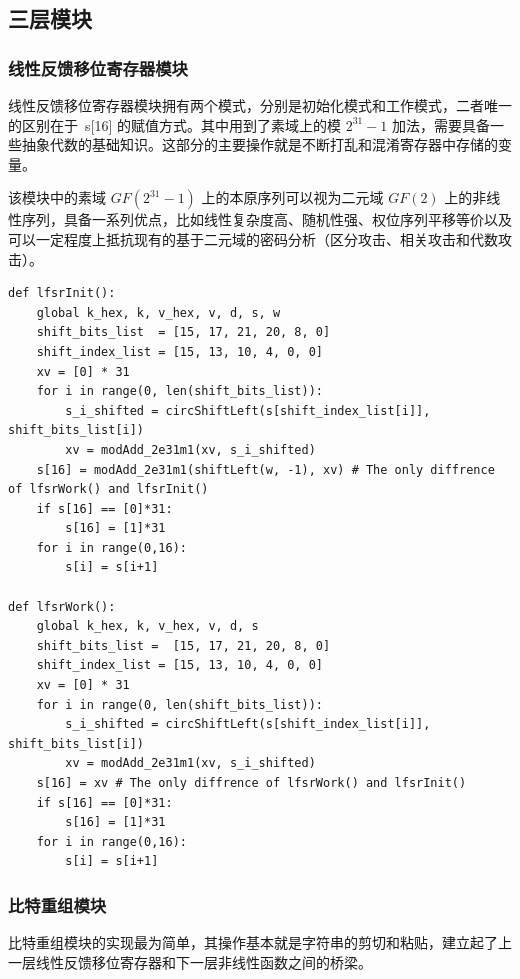 \subsection{三层模块}

\subsubsection{线性反馈移位寄存器模块}

线性反馈移位寄存器模块拥有两个模式，分别是初始化模式和工作模式，二者唯一的区别在于\ {\cnsls s[16]} 的赋值方式。其中用到了素域上的模 $2^{31}-1$ 加法，需要具备一些抽象代数的基础知识。这部分的主要操作就是不断打乱和混淆寄存器中存储的变量。

该模块中的素域 $GF(2^{31}-1)$ 上的本原序列可以视为二元域 $GF(2)$ 上的非线性序列，具备一系列优点，比如线性复杂度高、随机性强、权位序列平移等价以及可以一定程度上抵抗现有的基于二元域的密码分析（区分攻击、相关攻击和代数攻击）。 \cite{zuc_feng}

\begin{lstlisting}[style=myPython,label={lst:lfsr},caption={线性反馈移位寄存器的初始化模式和工作模式}]
def lfsrInit():
    global k_hex, k, v_hex, v, d, s, w
    shift_bits_list  = [15, 17, 21, 20, 8, 0]
    shift_index_list = [15, 13, 10, 4, 0, 0]
    xv = [0] * 31
    for i in range(0, len(shift_bits_list)):
        s_i_shifted = circShiftLeft(s[shift_index_list[i]], shift_bits_list[i])
        xv = modAdd_2e31m1(xv, s_i_shifted)
    s[16] = modAdd_2e31m1(shiftLeft(w, -1), xv) # The only diffrence of lfsrWork() and lfsrInit()
    if s[16] == [0]*31:
        s[16] = [1]*31
    for i in range(0,16):
        s[i] = s[i+1]

def lfsrWork():
    global k_hex, k, v_hex, v, d, s
    shift_bits_list =  [15, 17, 21, 20, 8, 0]
    shift_index_list = [15, 13, 10, 4, 0, 0]
    xv = [0] * 31
    for i in range(0, len(shift_bits_list)):
        s_i_shifted = circShiftLeft(s[shift_index_list[i]], shift_bits_list[i])
        xv = modAdd_2e31m1(xv, s_i_shifted)
    s[16] = xv # The only diffrence of lfsrWork() and lfsrInit()
    if s[16] == [0]*31:
        s[16] = [1]*31
    for i in range(0,16):
        s[i] = s[i+1]
\end{lstlisting}

\subsubsection{比特重组模块}

比特重组模块的实现最为简单，其操作基本就是字符串的剪切和粘贴，建立起了上一层线性反馈移位寄存器和下一层非线性函数之间的桥梁。

